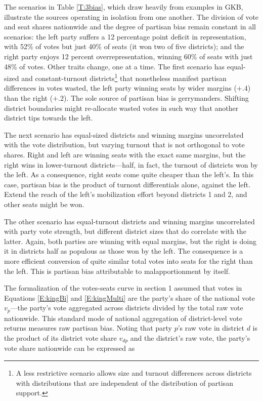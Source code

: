 \documentclass[letter,12pt]{article}
\begin{document}
The scenarios in Table \ref{T:3bias}, which draw heavily from examples in GKB, illustrate the sources operating in isolation from one another. The division of vote and seat shares nationwide and the degree of partisan bias remain constant in all scenarios: the left party suffers a 12 percentage point deficit in representation, with 52\% of votes but just 40\% of seats (it won two of five districts); and the right party enjoys 12 percent overrepresentation, winning 60\% of seats with just 48\% of votes. Other traits change, one at a time. The first scenario has equal-sized and constant-turnout districts\footnote{A less restrictive scenario allows size and turnout differences across districts with distributions that are independent of the distribution of partisan support.} that nonetheless manifest partisan differences in votes wasted, the left party winning seats by wider margins ($+.4$) than the right ($+.2$). The sole source of partisan bias is gerrymanders. Shifting district boundaries might re-allocate wasted votes in such way that another district tips towards the left. 

The next scenario has equal-sized districts and winning margins uncorrelated with the vote distribution, but varying turnout that is not orthogonal to vote shares. Right and left are winning seats with the exact same margins, but the right wins in lower-turnout districts---half, in fact, the turnout of districts won by the left. As a consequence, right seats come quite cheaper than the left's. In this case, partisan bias is the product of turnout differentials alone, against the left. Extend the reach of the left's mobilization effort beyond districts 1 and 2, and other seats might be won. 

The other scenario has equal-turnout districts and winning margins uncorrelated with party vote strength, but different district sizes that do correlate with the latter. Again, both parties are winning with equal margins, but the right is doing it in districts half as populous as those won by the left. The consequence is a more efficient conversion of quite similar total votes into seats for the right than the left. This is partisan bias attributable to malapportionment by itself.  

The formalization of the votes-seats curve in section 1 assumed that votes in Equations \ref{E:kingBi} and \ref{E:kingMulti} are the party's share of the national vote $v_p$---the party's vote aggregated across districts divided by the total raw vote nationwide. This standard mode of national aggregation of district-level vote returns measures raw partisan bias. Noting that party $p$'s raw vote in district $d$ is the product of its district vote share $v_{dp}$ and the district's raw vote, the party's vote share nationwide can be expressed as 
\end{document}
